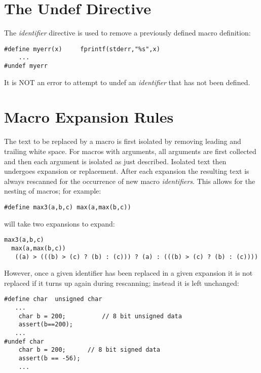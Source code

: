 \section{The Undef Directive}
\label{sec:Undef} 	 
The  {\it identifier}
	directive is used to remove a previously defined macro
	definition:
\begin{production}
\begin{verbatim}
#define myerr(x)     fprintf(stderr,"%s",x)
    ...
#undef myerr
\end{verbatim}
\end{production}

It is NOT an error to attempt to undef an {\it identifier} that has
	not been defined.



\section{Macro Expansion Rules}
\label{sec:MacroExpansionRules} 

The text to be replaced by a macro is first isolated by removing
leading and trailing white space. For macros with arguments, all
arguments are first collected and then each argument is isolated as
just described. Isolated text then undergoes expansion or
replacement. After each expansion the resulting text is always
rescanned for the occurrence of new macro {\it identifiers}. This
allows for the nesting of macros; for example:

\begin{production} 
{\tt \#define max3(a,b,c)	  max(a,max(b,c))}
\end{production} 

will take two expansions to expand:
\begin{production} 
\begin{verbatim}
max3(a,b,c) 
  max(a,max(b,c))  
   ((a) > (((b) > (c) ? (b) : (c))) ? (a) : (((b) > (c) ? (b) : (c))))
\end{verbatim}
\end{production} 

However, once a given identifier has been replaced in a given
expansion it is not replaced if it turns up again during rescanning;
instead it is left unchanged:

\begin{production}
\begin{verbatim}
#define char  unsigned char     
   ...
    char b = 200;          // 8 bit unsigned data
    assert(b==200);
   ...
#undef char
    char b = 200;      // 8 bit signed data
    assert(b == -56);
    ...
\end{verbatim}
\end{production}

